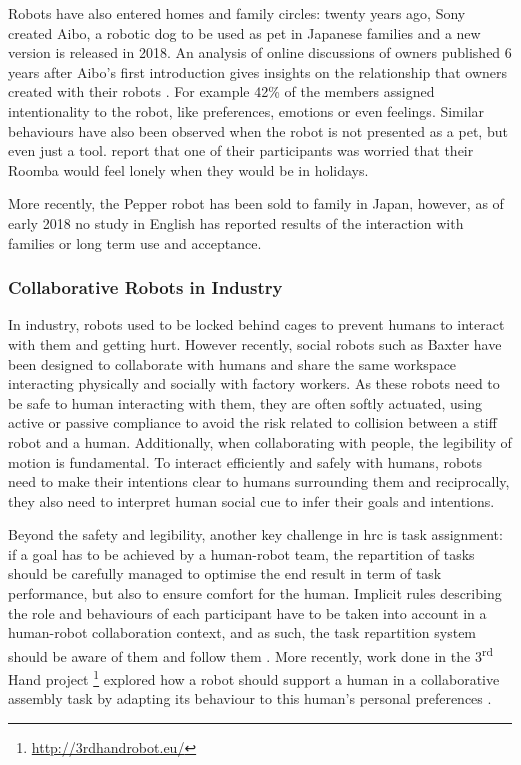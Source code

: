     Robots have also entered homes and family circles: twenty years ago, Sony created Aibo, a robotic dog to be used as pet in Japanese families and a new version is released in 2018. An analysis of online discussions of owners published 6 years after Aibo's first introduction gives insights on the relationship that owners created with their robots \citep{friedman2003hardware}. For example 42\% of the members assigned intentionality to the robot, like preferences, emotions or even feelings. Similar behaviours have also been observed when the robot is not presented as a pet, but even just a tool. \cite{fink2013living} report that one of their participants was worried that their Roomba would feel lonely when they would be in holidays. 
    
    More recently, the Pepper robot has been sold to family in Japan, however, as of early 2018 no study in English has reported results of the interaction with families or long term use and acceptance.

\subsubsection{Collaborative Robots in Industry}

	In industry, robots used to be locked behind cages to prevent humans to interact with them and getting hurt. However recently, social robots such as Baxter \citep{guizzo2012rethink} have been designed to collaborate with humans and share the same workspace interacting physically and socially with factory workers.	As these robots need to be safe to human interacting with them, they are often softly actuated, using active or passive compliance to avoid the risk related to collision between a stiff robot and a human. Additionally, when collaborating with people, the legibility of motion is fundamental. To interact efficiently and safely with humans, robots need to make their intentions clear to humans surrounding them \citep{dragan2013legibility} and reciprocally, they also need to interpret human social cue to infer their goals and intentions.
	
	Beyond the safety and legibility, another key challenge in \gls{hrc} is task assignment: if a goal has to be achieved by a human-robot team, the repartition of tasks should be carefully managed to  optimise the end result in term of task performance, but also to ensure comfort for the human. Implicit rules describing the role and behaviours of each participant have to be taken into account in a human-robot collaboration context, and as such, the task repartition system should be aware of them and follow them \citep{montreuil2007planning}. More recently, work done in the 3\textsuperscript{rd} Hand project \footnote{\url{http://3rdhandrobot.eu/}} explored how a robot should support a human in a collaborative assembly task by adapting its behaviour to this human's personal preferences \citep{munzer2017efficient}.
	

